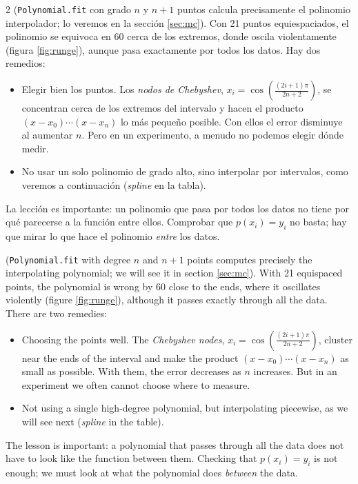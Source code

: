 \begin{paracol}{2}
(\texttt{Polynomial.fit} con grado $n$ y $n+1$ puntos calcula precisamente el polinomio interpolador; lo veremos en la sección \ref{sec:mc}). Con 21 puntos equiespaciados, el polinomio se equivoca en 60 cerca de los extremos, donde oscila violentamente (figura \ref{fig:runge}), aunque pasa exactamente por todos los datos. Hay dos remedios:
\begin{itemize}
\item Elegir bien los puntos. Los \emph{nodos de Chebyshev}, $x_i=\cos\left(\frac{(2i+1)\pi}{2n+2}\right)$, se concentran cerca de los extremos del intervalo y hacen el producto $(x-x_0)\cdots(x-x_n)$ lo más pequeño posible. Con ellos el error disminuye al aumentar $n$. Pero en un experimento, a menudo no podemos elegir dónde medir.
\item No usar un solo polinomio de grado alto, sino interpolar por intervalos, como veremos a continuación (\emph{spline} en la tabla).
\end{itemize}
La lección es importante: un polinomio que pasa por todos los datos no tiene por qué parecerse a la función entre ellos. Comprobar que $p(x_i)=y_i$ no basta; hay que mirar lo que hace el polinomio \emph{entre} los datos.

\switchcolumn
(\texttt{Polynomial.fit} with degree $n$ and $n+1$ points computes precisely the interpolating polynomial; we will see it in section \ref{sec:mc}). With 21 equispaced points, the polynomial is wrong by 60 close to the ends, where it oscillates violently (figure \ref{fig:runge}), although it passes exactly through all the data. There are two remedies:
\begin{itemize}
\item Choosing the points well. The \emph{Chebyshev nodes}, $x_i=\cos\left(\frac{(2i+1)\pi}{2n+2}\right)$, cluster near the ends of the interval and make the product $(x-x_0)\cdots(x-x_n)$ as small as possible. With them, the error decreases as $n$ increases. But in an experiment we often cannot choose where to measure.
\item Not using a single high-degree polynomial, but interpolating piecewise, as we will see next (\emph{spline} in the table).
\end{itemize}
The lesson is important: a polynomial that passes through all the data does not have to look like the function between them. Checking that $p(x_i)=y_i$ is not enough; we must look at what the polynomial does \emph{between} the data.
\end{paracol}


